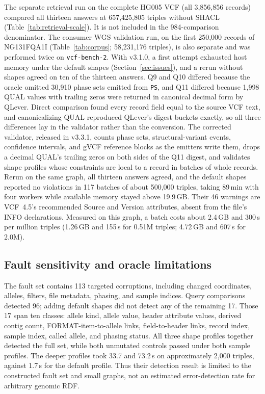 \documentclass[11pt]{article}
\begin{document}
The separate retrieval run on the complete HG005 VCF (all 3,856,856 records) compared all thirteen answers at 657,425,805 triples without SHACL (Table~\ref{tab:retrieval-scale}).
It is not included in the 984-comparison denominator.
The consumer WGS validation run, on the first 250,000 records of NG131FQA1I (Table~\ref{tab:corpus}; 58,231,176 triples), is also separate and was performed twice on \texttt{vcf-bench-2}.
With v3.1.0, a first attempt exhausted host memory under the default shapes (Section~\ref{sec:issues}), and a rerun without shapes agreed on ten of the thirteen answers.
Q9 and Q10 differed because the oracle omitted 30,910 phase sets emitted from \texttt{PS}, and Q11 differed because 1,998 QUAL values with trailing zeros were returned in canonical decimal form by QLever.
Direct comparison found every record field equal to the source VCF text, and canonicalizing QUAL reproduced QLever's digest buckets exactly, so all three differences lay in the validator rather than the conversion.
The corrected validator, released in v3.3.1, counts phase sets, structural-variant events, confidence intervals, and gVCF reference blocks as the emitters write them, drops a decimal QUAL's trailing zeros on both sides of the Q11 digest, and validates shape profiles whose constraints are local to a record in batches of whole records.
Rerun on the same graph, all thirteen answers agreed, and the default shapes reported no violations in 117 batches of about 500,000 triples, taking 89\,min with four workers while available memory stayed above 19.9\,GB.
Their 46 warnings are VCF~4.5's recommended Source and Version attributes, absent from the file's INFO declarations.
Measured on this graph, a batch costs about 2.4\,GB and 300\,s per million triples (1.26\,GB and 155\,s for 0.51M triples; 4.72\,GB and 607\,s for 2.0M).

\subsection{Fault sensitivity and oracle limitations}\label{subsec:validation-sensitivity}
The fault set contains 113 targeted corruptions, including changed coordinates, alleles, filters, file metadata, phasing, and sample indices.
Query comparisons detected 96; adding default shapes did not detect any of the remaining 17.
Those 17 span ten classes: allele kind, allele value, header attribute values, derived contig count, FORMAT-item-to-allele links, field-to-header links, record index, sample index, called allele, and phasing status.
All three shape profiles together detected the full set, while both unmutated controls passed under both sample profiles.
The deeper profiles took 33.7 and 73.2\,s on approximately 2,000 triples, against 1.7\,s for the default profile.
Thus their detection result is limited to the constructed fault set and small graphs, not an estimated error-detection rate for arbitrary genomic RDF.
\end{document}
